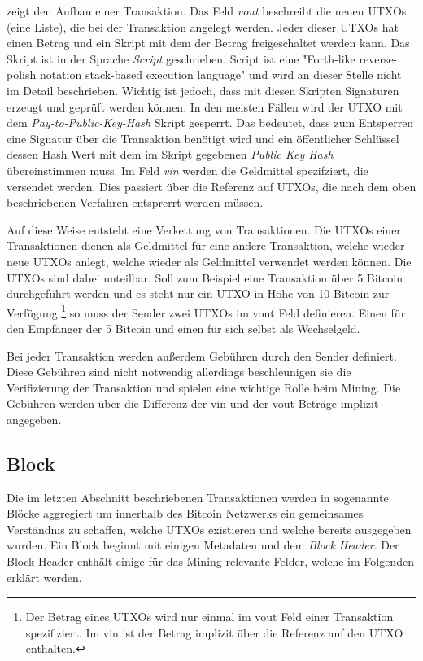 \documentclass[ngerman,runningheads,a4paper]{llncs}[2018/03/10]
\begin{document}
 zeigt den Aufbau einer Transaktion. Das Feld \textit{vout} beschreibt die neuen UTXOs (eine Liste), die bei der Transaktion angelegt werden. Jeder dieser UTXOs hat einen Betrag und ein Skript mit dem der Betrag freigeschaltet werden kann. Das Skript ist in der Sprache \textit{Script} geschrieben. Script ist eine "Forth-like reverse-polish notation stack-based execution language" \citep{bitcoinbook} und wird an dieser Stelle nicht im Detail beschrieben. Wichtig ist jedoch, dass mit diesen Skripten Signaturen erzeugt und geprüft werden können. In den meisten Fällen wird der UTXO mit dem \textit{Pay-to-Public-Key-Hash} \citep{bitcoinbook} Skript gesperrt. Das bedeutet, dass zum Entsperren eine Signatur über die Transaktion benötigt wird und ein öffentlicher Schlüssel dessen Hash Wert mit dem im Skript gegebenen \textit{Public Key Hash} übereinstimmen muss. Im Feld \textit{vin} werden die Geldmittel spezifziert, die versendet werden. Dies passiert über die Referenz auf UTXOs, die nach dem oben beschriebenen Verfahren entsprerrt werden müssen.

Auf diese Weise entsteht eine Verkettung von Transaktionen. Die UTXOs einer Transaktionen dienen als Geldmittel für eine andere Transaktion, welche wieder neue UTXOs anlegt, welche wieder als Geldmittel verwendet werden können. Die UTXOs sind dabei unteilbar. Soll zum Beispiel eine Transaktion über 5 Bitcoin durchgeführt werden und es steht nur ein UTXO in Höhe von 10 Bitcoin zur Verfügung \footnote{Der Betrag eines UTXOs wird nur einmal im vout Feld einer Transaktion spezifiziert. Im vin ist der Betrag implizit über die Referenz auf den UTXO enthalten.} so muss der Sender zwei UTXOs im vout Feld definieren. Einen für den Empfänger der 5 Bitcoin und einen für sich selbst als Wechselgeld.

Bei jeder Transaktion werden außerdem Gebühren durch den Sender definiert. Diese Gebühren sind nicht notwendig allerdings beschleunigen sie die Verifizierung der Transaktion und spielen eine wichtige Rolle beim Mining. Die Gebühren werden über die Differenz der vin und der vout Beträge implizit angegeben.

\subsection{Block}\label{sec:Block}

Die im letzten Abschnitt beschriebenen Transaktionen werden in sogenannte Blöcke aggregiert um innerhalb des Bitcoin Netzwerks ein gemeinsames Verständnis zu schaffen, welche UTXOs existieren und welche bereits ausgegeben wurden. Ein Block beginnt mit einigen Metadaten und dem \textit{Block Header}. Der Block Header enthält einige für das Mining relevante Felder, welche im Folgenden erklärt werden.
\end{document}
